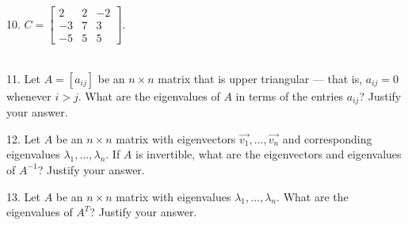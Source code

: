 \documentclass{article}
\begin{document}
10. $C = \left[\begin{array}{ccc} 2& 2& -2 \\ -3& 7& 3 \\ -5& 5& 5 \end{array}\right]$.

~\\

11. Let $A = [a_{ij}]$ be an $n \times n$ matrix that is upper triangular --- that is, $a_{ij} = 0$ whenever $i > j$. What are the eigenvalues of $A$ in terms of the entries $a_{ij}$? Justify your answer.

12. Let $A$ be an $n \times n$ matrix with eigenvectors $\vec{v_1}, ..., \vec{v_n}$ and corresponding eigenvalues $\lambda_1, ..., \lambda_n$. If $A$ is invertible, what are the eigenvectors and eigenvalues of $A^{-1}$? Justify your answer.

13. Let $A$ be an $n \times n$ matrix with eigenvalues $\lambda_1, ..., \lambda_n$. What are the eigenvalues of $A^T$? Justify your answer.
\end{document}
